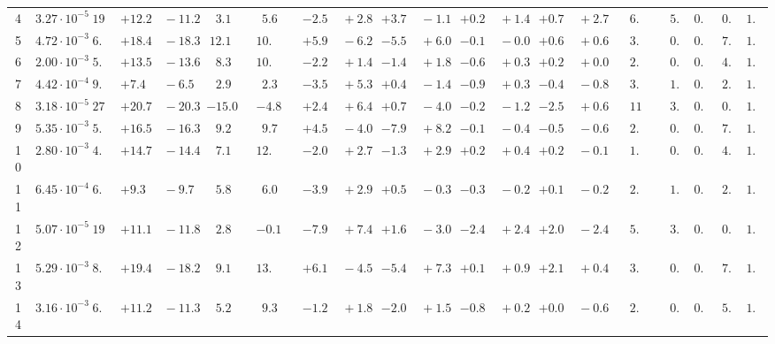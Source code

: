 \documentclass[12pt]{article}
\begin{document}
\begin{table}
\begin{tabular}{ccrr@{\hskip0pt}rrc@{\hskip0pt}r@{\hskip0pt}c@{\hskip0pt}r@{\hskip0pt}rr@{\hskip0pt}rr@{\hskip0pt}rr@{\hskip0pt}rr@{\hskip0pt}r@{\hskip0pt}r@{\hskip0pt}c|rr|r}
4 &$3.27 \cdot 10^{-5}$ &$19.8$  & ${+12.2~}$&${~-11.2}$ & $ 3.1$  & &$ 5.6$&&${-2.5~}$&${~+2.8}$ & ${+3.7~}$&${~-1.1}$ & ${+0.2~}$&${~+1.4}$ & ${+0.7~}$&${~+2.7}$ & &$ 6.7$&&$ 5.7$  & $0.84$  & $ 0.3$  & $1.04$   \\ 
5 &$4.72 \cdot 10^{-3}$ &$ 6.3$  & ${+18.4~}$&${~-18.3}$ & $12.1$  & &$10.4$&&${+5.9~}$&${~-6.2}$ & ${-5.5~}$&${~+6.0}$ & ${-0.1~}$&${~-0.0}$ & ${+0.6~}$&${~+0.6}$ & &$ 3.0$&&$ 0.5$  & $0.74$  & $ 7.5$  & $1.03$   \\ 
6 &$2.00 \cdot 10^{-3}$ &$ 5.9$  & ${+13.5~}$&${~-13.6}$ & $ 8.3$  & &$10.0$&&${-2.2~}$&${~+1.4}$ & ${-1.4~}$&${~+1.8}$ & ${-0.6~}$&${~+0.3}$ & ${+0.2~}$&${~+0.0}$ & &$ 2.3$&&$ 0.6$  & $0.79$  & $ 4.7$  & $1.04$   \\ 
7 &$4.42 \cdot 10^{-4}$ &$ 9.1$  & ${+7.4~}$&${~-6.5}$ & $ 2.9$  & &$ 2.3$&&${-3.5~}$&${~+5.3}$ & ${+0.4~}$&${~-1.4}$ & ${-0.9~}$&${~+0.3}$ & ${-0.4~}$&${~-0.8}$ & &$ 3.0$&&$ 1.2$  & $0.84$  & $ 2.1$  & $1.03$   \\ 
8 &$3.18 \cdot 10^{-5}$ &$27.5$  & ${+20.7~}$&${~-20.3}$ & $-15.0$  & &$-4.8$&&${+2.4~}$&${~+6.4}$ & ${+0.7~}$&${~-4.0}$ & ${-0.2~}$&${~-1.2}$ & ${-2.5~}$&${~+0.6}$ & &$11.0$&&$ 3.9$  & $0.84$  & $ 0.7$  & $1.08$   \\ 
9 &$5.35 \cdot 10^{-3}$ &$ 5.4$  & ${+16.5~}$&${~-16.3}$ & $ 9.2$  & &$ 9.7$&&${+4.5~}$&${~-4.0}$ & ${-7.9~}$&${~+8.2}$ & ${-0.1~}$&${~-0.4}$ & ${-0.5~}$&${~-0.6}$ & &$ 2.4$&&$ 0.5$  & $0.73$  & $ 7.3$  & $1.03$   \\ 
10 &$2.80 \cdot 10^{-3}$ &$ 4.8$  & ${+14.7~}$&${~-14.4}$ & $ 7.1$  & &$12.0$&&${-2.0~}$&${~+2.7}$ & ${-1.3~}$&${~+2.9}$ & ${+0.2~}$&${~+0.4}$ & ${+0.2~}$&${~-0.1}$ & &$ 1.7$&&$ 0.6$  & $0.79$  & $ 4.7$  & $1.05$   \\ 
11 &$6.45 \cdot 10^{-4}$ &$ 6.9$  & ${+9.3~}$&${~-9.7}$ & $ 5.8$  & &$ 6.0$&&${-3.9~}$&${~+2.9}$ & ${+0.5~}$&${~-0.3}$ & ${-0.3~}$&${~-0.2}$ & ${+0.1~}$&${~-0.2}$ & &$ 2.1$&&$ 1.1$  & $0.84$  & $ 2.7$  & $1.04$   \\ 
12 &$5.07 \cdot 10^{-5}$ &$19.6$  & ${+11.1~}$&${~-11.8}$ & $ 2.8$  & &$-0.1$&&${-7.9~}$&${~+7.4}$ & ${+1.6~}$&${~-3.0}$ & ${-2.4~}$&${~+2.4}$ & ${+2.0~}$&${~-2.4}$ & &$ 5.9$&&$ 3.5$  & $0.86$  & $ 0.2$  & $1.03$   \\ 
13 &$5.29 \cdot 10^{-3}$ &$ 8.2$  & ${+19.4~}$&${~-18.2}$ & $ 9.1$  & &$13.7$&&${+6.1~}$&${~-4.5}$ & ${-5.4~}$&${~+7.3}$ & ${+0.1~}$&${~+0.9}$ & ${+2.1~}$&${~+0.4}$ & &$ 3.1$&&$ 0.6$  & $0.73$  & $ 7.3$  & $1.04$   \\ 
14 &$3.16 \cdot 10^{-3}$ &$ 6.2$  & ${+11.2~}$&${~-11.3}$ & $ 5.2$  & &$ 9.3$&&${-1.2~}$&${~+1.8}$ & ${-2.0~}$&${~+1.5}$ & ${-0.8~}$&${~+0.2}$ & ${+0.0~}$&${~-0.6}$ & &$ 2.0$&&$ 0.8$  & $0.79$  & $ 5.2$  & $1.04$   \\ 

\end{tabular}
\end{table}
\end{document}
